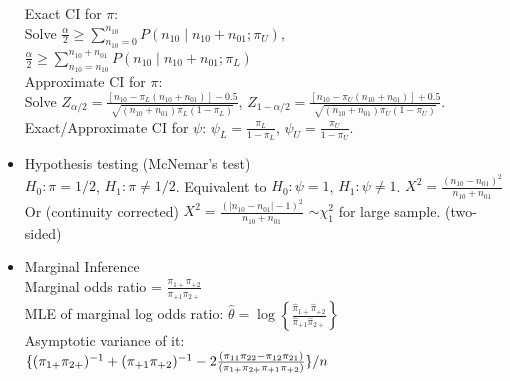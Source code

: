\documentclass[a4paper,10pt]{article}
\begin{document}
\begin{multicols}{3}
\begin{itemize}
    Exact CI for $\pi$:\\ Solve
    $\frac{\alpha}{2} \geq \sum_{n_{10}=0}^{n_{10}} P(n_{10} \mid n_{10} + n_{01}; \pi_U)$,
    $\frac{\alpha}{2} \geq \sum_{n_{10}=n_{10}}^{n_{10} + n_{01}} P(n_{10} \mid n_{10} + n_{01}; \pi_L)$\\
    Approximate CI for $\pi$:\\ Solve
    $Z_{\alpha / 2} = \frac{\left[n_{10} - \pi_L (n_{10} + n_{01})\right] - 0.5}{\sqrt{(n_{10} + n_{01}) \pi_L (1 - \pi_L)}}$, 
    $Z_{1 - \alpha / 2} = \frac{\left[n_{10} - \pi_U (n_{10} + n_{01})\right] + 0.5}{\sqrt{(n_{10} + n_{01}) \pi_U (1 - \pi_U)}}$.\\
    Exact/Approximate CI for $\psi$: $\psi_L = \frac{\pi_L}{1 - \pi_L}$, $\psi_U = \frac{\pi_U}{1 - \pi_U}$.\\
    \item Hypothesis testing (McNemar's test)\\
    $H_0 : \pi = 1/2$, $H_1 : \pi \neq 1/2$. Equivalent to $H_0 : \psi = 1$, $H_1 : \psi \neq 1$.
    $X^2 = \frac{(n_{10} - n_{01})^2}{n_{10} + n_{01}}$ Or (continuity corrected) $X^2=\frac{\left( |n_{10} - n_{01}| - 1 \right)^2}{n_{10} + n_{01}}$  $\sim \chi^2_1$ for large sample. (two-sided)
    \item Marginal Inference\\
    Marginal odds ratio = $\frac{\pi_{1+}  \pi_{+2}}{\pi_{+1}  \pi_{2+}}$\\
    MLE of marginal log odds ratio: $\hat{\theta} = \log\left\{\frac{\hat{\pi}_{1+} \hat{\pi}_{+2}}{\hat{\pi}_{+1} \hat{\pi}_{2+}}\right\}$\\
    Asymptotic variance of it:\\ $
    \{ (\pi_{1+} \pi_{2+})^{-1} + (\pi_{+1} \pi_{+2})^{-1} \\
    - 2 \frac{(\pi_{11} \pi_{22} - \pi_{12} \pi_{21})}{(\pi_{1+} \pi_{2+} \pi_{+1} \pi_{+2})} \} / n
    $  
\end{itemize}


\end{multicols}
\end{document}
